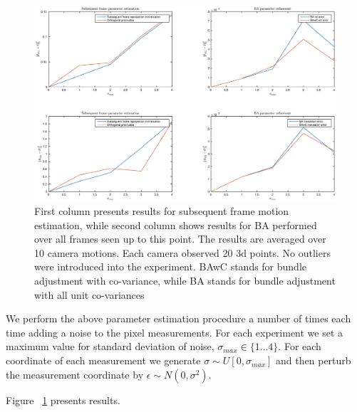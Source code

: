 \documentclass[10pt]{article}         %
\begin{document}
\begin{figure}
  \centering
  \includegraphics[width=1\textwidth]{graphs}
  \caption{First column presents results for subsequent frame motion
    estimation, while second column shows results for BA performed
    over all frames seen up to this point.  The results are averaged
    over 10 camera motions.  Each camera observed 20 3d points.  No
    outliers were introduced into the experiment. BAwC stands for
    bundle adjustment with co-variance, while BA stands for bundle
    adjustment with all unit co-variances}
  \label{fig:graphs}
\end{figure}

We perform the above parameter estimation procedure a number of times
each time adding a noise to the pixel measurements. For each
experiment we set a maximum value for standard deviation of noise,
$\sigma_{max}\in \{1\dotsc 4\}$. For each coordinate of each measurement we generate
$\sigma \sim U[0,\sigma_{max}]$ and then perturb the measurement
coordinate by $\epsilon \sim N(0,\sigma^2)$.

Figure ~\ref{fig:graphs} presents results.
\end{document}

